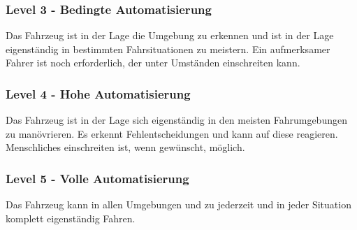 \subsubsection{Level 3 - Bedingte Automatisierung}
Das Fahrzeug ist in der Lage die Umgebung zu erkennen und ist in der Lage eigenständig in bestimmten Fahrsituationen zu meistern. Ein aufmerksamer Fahrer ist noch erforderlich, der unter Umständen einschreiten kann.

\subsubsection{Level 4 - Hohe Automatisierung}
Das Fahrzeug ist in der Lage sich eigenständig in den meisten Fahrumgebungen zu manövrieren. Es erkennt Fehlentscheidungen und kann auf diese reagieren. Menschliches einschreiten ist, wenn gewünscht, möglich.

\subsubsection{Level 5 - Volle Automatisierung}
Das Fahrzeug kann in allen Umgebungen und zu jederzeit und in jeder Situation komplett eigenständig Fahren.

\vfill


\pagebreak